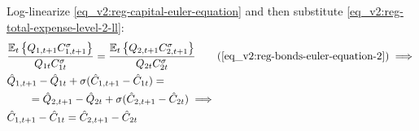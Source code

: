 \documentclass[../thesis.tex]{subfiles}
\begin{document}
Log-linearize \ref{eq_v2:reg-capital-euler-equation} and then substitute \ref{eq_v2:reg-total-expense-level-2-ll}:
\begin{align}
	& \frac{\mathbb{E}_{t} \left\{ Q_{1, t+1} C_{1, t+1}^{\sigma} \right\}}{Q_{1t} C_{1t}^{\sigma}} = \frac{\mathbb{E}_{t} \left\{ Q_{2, t+1} C_{2, t+1}^{\sigma} \right\}}{Q_{2t} C_{2t}^{\sigma}} \tag{\ref{eq_v2:reg-bonds-euler-equation-2}} \implies \\
	& \hat{Q}_{1, t+1} - \hat{Q}_{1t} + \sigma (\hat{C}_{1, t+1} - \hat{C}_{1t}) = \nonumber \\ 
	&\qquad = \hat{Q}_{2, t+1} - \hat{Q}_{2t} + \sigma (\hat{C}_{2, t+1} - \hat{C}_{2t}) \implies \nonumber \\
	& \hat{C}_{1, t+1} - \hat{C}_{1t} = \hat{C}_{2, t+1} - \hat{C}_{2t} \label{eq_v2:reg-bonds-euler-equation-2-ll}
\end{align}


\begin{comment}
	
\subsubsection*{Euler equation for the capital return}

Log-linearize \ref{eq_v2:reg-capital-euler-equation}:
\begin{alignat}{2}
	& \frac{ C_{\eta t}^{1-\sigma}}{Q_{\eta t}} P_{\eta t} = \beta \mathbb{E}_t \left\{ \frac{ C_{\eta, t+1}^{1-\sigma}}{Q_{\eta, t+1}} [(1-\delta) P_{\eta, t+1} + R_{K,t+1}] \right\} \implies \tag{\ref{eq_v2:reg-capital-euler-equation}} \\
	& \frac{P_{\eta t} C_{\eta t}^{1-\sigma}}{Q_{\eta t}} \mathbb{E}_t \left\{ \frac{\te[t+1]}{P_{\eta, t+1} C_{\eta, t+1}^{1-\sigma}} \right\} = \beta \left[ (1-\delta) + \mathbb{E}_t \left\{ \frac{R_{K,t+1}}{P_{\eta, t+1}} \right\} \right] \implies \nonumber \\
	& \frac{P_{\eta} C_{\eta}^{1-\sigma}}{\te[]} \cdot \frac{\te[]}{P_{\eta} C_{\eta}^{1-\sigma}} (1 + \hat{P}_{\eta t} + (1 -\sigma) \hat{C}_{\eta t} - \hat{\mathscr{E}}_{\eta t} + \nonumber \\ 
	& \qquad + \E \{\hat{\mathscr{E}}_{\eta, t+1} - \hat{P}_{\eta, t+1} - (1 -\sigma) \hat{C}_{\eta, t+1}\}) = \nonumber \\
	& \qquad = \beta \left[ (1-\delta) + \frac{R_{K}}{P_{\eta}} \mathbb{E}_t \left\{ 1 + \hat{R}_{K, t+1} -\hat{P}_{\eta, t+1} \right\} \right] \implies \nonumber \\
	& \E \left\{ \hat{\mathscr{E}}_{\eta, t+1} - \hat{P}_{\eta, t+1}  - (1 -\sigma) \hat{C}_{\eta, t+1} \right\} - (\hat{\mathscr{E}}_{\eta t} - \hat{P}_{\eta t} - (1 -\sigma) \hat{C}_{\eta t}) = \nonumber \\
	& \qquad = \beta r_{K} \mathbb{E}_t \left\{ \hat{R}_{K, t+1} - \hat{P}_{\eta, t+1} \right\} \label{eq_v2:reg-ll-capital-euler-equation} \\
	& \qquad \text{where: } r_{K} = \frac{R_{K}}{P_{}} \label{eq_v2:reg-rk}
\end{alignat}	
	
\end{comment}
	
\end{document}
